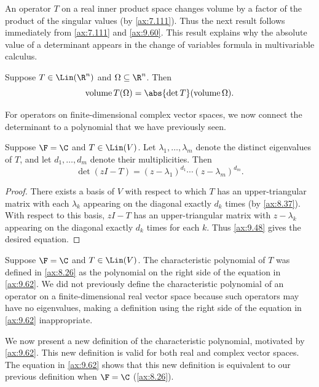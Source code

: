 An operator $T$ on a real inner product space changes volume by a factor of the
product of the singular values (by \ref{ax:7.111}). Thus the next result
follows immediately from \ref{ax:7.111} and \ref{ax:9.60}. This result explains
why the absolute value of a determinant appears in the change of variables
formula in multivariable calculus.

\begin{result}\label{ax:9.61}
Suppose $T\in\Lin(\R^n)$ and $\Omega\subseteq\R^n$. Then
\[ \operatorname{volume} T(\Omega)
   = \abs{\det T}(\operatorname{volume}\Omega). \]
\end{result}

For operators on finite-dimensional complex vector spaces, we now connect the
determinant to a polynomial that we have previously seen.

\begin{result}[If $\F=\C$, then characteristic polynomial of $T$ equals $\det(zI-T)$]\label{ax:9.62}
Suppose $\F=\C$ and $T\in\Lin(V)$. Let $\lambda_1,\dots,\lambda_m$ denote the
distinct eigenvalues of $T$, and let $d_1,\dots,d_m$ denote their
multiplicities. Then
\[ \det(zI-T) = (z-\lambda_1)^{d_1}\cdots(z-\lambda_m)^{d_m}. \]
\end{result}

\begin{proof}
There exists a basis of $V$ with respect to which $T$ has an upper-triangular
matrix with each $\lambda_k$ appearing on the diagonal exactly $d_k$ times (by
\ref{ax:8.37}). With respect to this basis, $zI-T$ has an upper-triangular
matrix with $z-\lambda_k$ appearing on the diagonal exactly $d_k$ times for
each $k$. Thus \ref{ax:9.48} gives the desired equation.
\end{proof}

Suppose $\F=\C$ and $T\in\Lin(V)$. The characteristic polynomial of $T$ was
defined in \ref{ax:8.26} as the polynomial on the right side of the equation in
\ref{ax:9.62}. We did not previously define the characteristic polynomial of an
operator on a finite-dimensional real vector space because such operators may
have no eigenvalues, making a definition using the right side of the equation
in \ref{ax:9.62} inappropriate.

We now present a new definition of the characteristic polynomial, motivated by
\ref{ax:9.62}. This new definition is valid for both real and complex vector
spaces. The equation in \ref{ax:9.62} shows that this new definition is
equivalent to our previous definition when $\F=\C$ (\ref{ax:8.26}).

